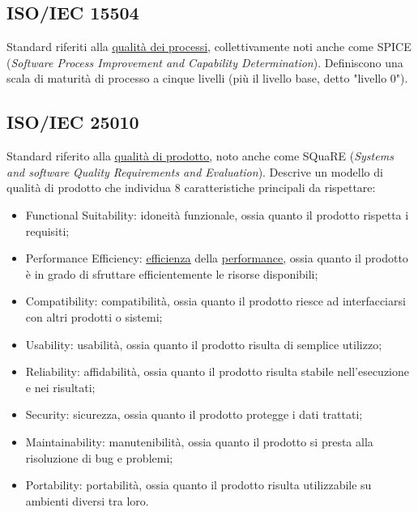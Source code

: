 	\subsection{ISO/IEC 15504}
	\label{sec:iso15504}
	Standard riferiti alla \underline{\hyperref[sec:qualitaprocessi]{qualità dei processi}}, collettivamente noti anche come SPICE (\emph{Software Process Improvement and Capability Determination}). Definiscono una scala di maturità di processo a cinque livelli (più il livello base, detto "livello 0").


	\subsection{ISO/IEC 25010}
	\label{sec:iso25010d}
	Standard riferito alla \underline{\hyperref[sec:qualitaprodotto]{qualità di prodotto}}, noto anche come SQuaRE (\emph{Systems and software Quality Requirements and Evaluation}). Descrive un modello di qualità di prodotto che individua 8 caratteristiche principali da rispettare: \begin{itemize}
	\item Functional Suitability: idoneità funzionale, ossia quanto il prodotto rispetta i requisiti;
	\item Performance Efficiency: \underline{\hyperref[sec:efficienza]{efficienza}} della \underline{\hyperref[sec:performance]{performance}}, ossia quanto il prodotto è in grado di sfruttare efficientemente le risorse disponibili;
	\item Compatibility: compatibilità, ossia quanto il prodotto riesce ad interfacciarsi con altri prodotti o sistemi;
	\item Usability: usabilità, ossia quanto il prodotto risulta di semplice utilizzo;
	\item Reliability: affidabilità, ossia quanto il prodotto risulta stabile nell'esecuzione e nei risultati;
	\item Security: sicurezza, ossia quanto il prodotto protegge i dati trattati;
	\item Maintainability: manutenibilità, ossia quanto il prodotto si presta alla risoluzione di bug e problemi;
	\item Portability: portabilità, ossia quanto il prodotto risulta utilizzabile su ambienti diversi tra loro.
	\end{itemize}


